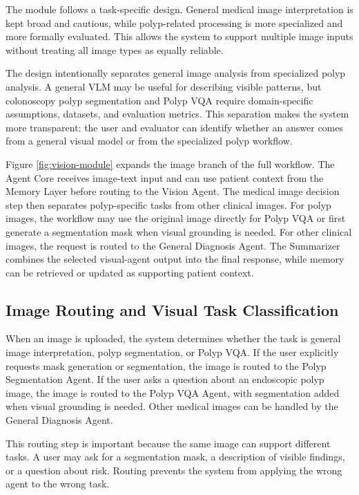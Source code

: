 The module follows a task-specific design. General medical image interpretation is kept broad and cautious, while polyp-related processing is more specialized and more formally evaluated. This allows the system to support multiple image inputs without treating all image types as equally reliable.

The design intentionally separates general image analysis from specialized polyp analysis. A general VLM may be useful for describing visible patterns, but colonoscopy polyp segmentation and Polyp VQA require domain-specific assumptions, datasets, and evaluation metrics. This separation makes the system more transparent: the user and evaluator can identify whether an answer comes from a general visual model or from the specialized polyp workflow.


Figure \ref{fig:vision-module} expands the image branch of the full workflow. The Agent Core receives image-text input and can use patient context from the Memory Layer before routing to the Vision Agent. The medical image decision step then separates polyp-specific tasks from other clinical images. For polyp images, the workflow may use the original image directly for Polyp VQA or first generate a segmentation mask when visual grounding is needed. For other clinical images, the request is routed to the General Diagnosis Agent. The Summarizer combines the selected visual-agent output into the final response, while memory can be retrieved or updated as supporting patient context.

\subsection{Image Routing and Visual Task Classification}

When an image is uploaded, the system determines whether the task is general image interpretation, polyp segmentation, or Polyp VQA. If the user explicitly requests mask generation or segmentation, the image is routed to the Polyp Segmentation Agent. If the user asks a question about an endoscopic polyp image, the image is routed to the Polyp VQA Agent, with segmentation added when visual grounding is needed. Other medical images can be handled by the General Diagnosis Agent.

This routing step is important because the same image can support different tasks. A user may ask for a segmentation mask, a description of visible findings, or a question about risk. Routing prevents the system from applying the wrong agent to the wrong task.

